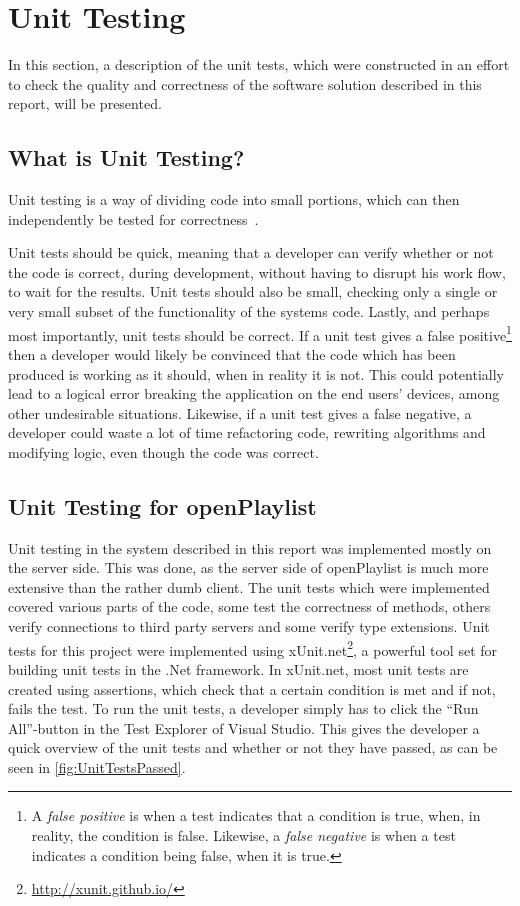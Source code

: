\section{Unit Testing}
\label{unitTesting}
In this section, a description of the unit tests, which were constructed in an effort to check the quality and correctness of the software solution described in this report, will be presented.

\subsection{What is Unit Testing?}
Unit testing is a way of dividing code into small portions, which can then independently be tested for correctness~\cite{unittesting}.

Unit tests should be quick, meaning that a developer can verify whether or not the code is correct, during development, without having to disrupt his work flow, to wait for the results.
Unit tests should also be small, checking only a single or very small subset of the functionality of the systems code.
Lastly, and perhaps most importantly, unit tests should be correct. If a unit test gives a false positive\footnote{A \emph{false positive} is when a test indicates that a condition is true, when, in reality, the condition is false. Likewise, a \emph{false negative} is when a test indicates a condition being false, when it is true.} then a developer would likely be convinced that the code which has been produced is working as it should, when in reality it is not. This could potentially lead to a logical error breaking the application on the end users' devices, among other undesirable situations. Likewise, if a unit test gives a false negative, a developer could waste a lot of time refactoring code, rewriting algorithms and modifying logic, even though the code was correct.

\subsection{Unit Testing for openPlaylist}
Unit testing in the system described in this report was implemented mostly on the server side. This was done, as the server side of openPlaylist is much more extensive than the rather dumb client.
The unit tests which were implemented covered various parts of the code, some test the correctness of methods, others verify connections to third party servers and some verify type extensions.
Unit tests for this project were implemented using xUnit.net\footnote{\url{http://xunit.github.io/}}, a powerful tool set for building unit tests in the .Net framework. In xUnit.net, most unit tests are created using assertions, which check that a certain condition is met and if not, fails the test.
To run the unit tests, a developer simply has to click the \enquote{Run All}-button in the Test Explorer of Visual Studio. This gives the developer a quick overview of the unit tests and whether or not they have passed, as can be seen in \cref{fig:UnitTestsPassed}.

